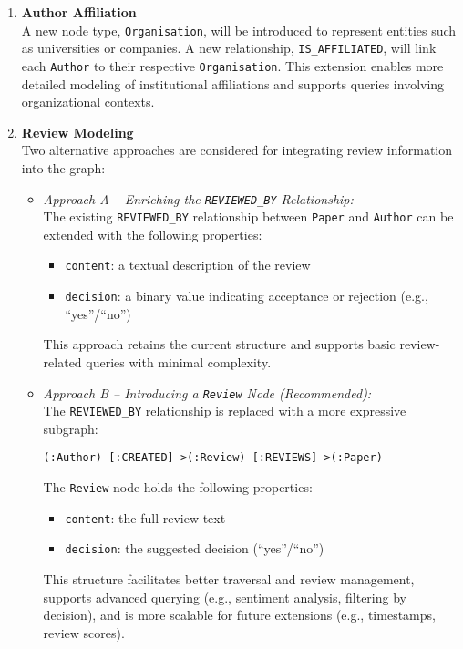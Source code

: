 \documentclass{article}
\begin{document}
\begin{enumerate}
    \item \textbf{Author Affiliation} \\
    A new node type, \texttt{Organisation}, will be introduced to represent entities such as universities or companies. A new relationship, \texttt{IS\_AFFILIATED}, will link each \texttt{Author} to their respective \texttt{Organisation}. This extension enables more detailed modeling of institutional affiliations and supports queries involving organizational contexts.

    \item \textbf{Review Modeling} \\
    Two alternative approaches are considered for integrating review information into the graph:

    \begin{itemize}
        \item \textit{Approach A – Enriching the \texttt{REVIEWED\_BY} Relationship:} \\
        The existing \texttt{REVIEWED\_BY} relationship between \texttt{Paper} and \texttt{Author} can be extended with the following properties:
        \begin{itemize}
            \item \texttt{content}: a textual description of the review
            \item \texttt{decision}: a binary value indicating acceptance or rejection (e.g., ``yes''/``no'')
        \end{itemize}
        This approach retains the current structure and supports basic review-related queries with minimal complexity.

        \item \textit{Approach B – Introducing a \texttt{Review} Node (Recommended):} \\
        The \texttt{REVIEWED\_BY} relationship is replaced with a more expressive subgraph:
        \begin{center}
            \texttt{(:Author)-[:CREATED]->(:Review)-[:REVIEWS]->(:Paper)}
        \end{center}
        The \texttt{Review} node holds the following properties:
        \begin{itemize}
            \item \texttt{content}: the full review text
            \item \texttt{decision}: the suggested decision (``yes''/``no'')
        \end{itemize}
        This structure facilitates better traversal and review management, supports advanced querying (e.g., sentiment analysis, filtering by decision), and is more scalable for future extensions (e.g., timestamps, review scores).
    \end{itemize}


\end{enumerate}
\end{document}
